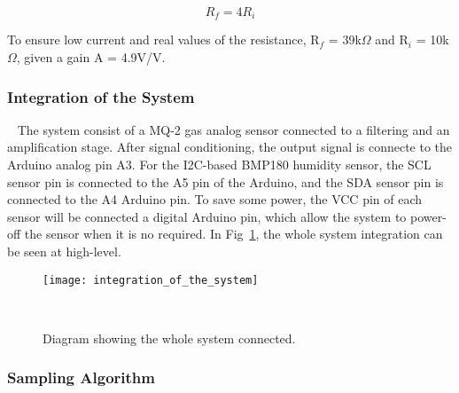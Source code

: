 \begin{equation}
    R_{f} = 4 R_{i}
\end{equation}

To ensure low current and real values of the resistance, R$_{f}$ = 39k$\Omega$ and R$_{i}$ = 10k$\Omega$, given a gain A = 4.9V/V.



\subsubsection{Integration of the System}
~\label{sec:methodology:dev_methodology:iots}
\hspace{8pt}
The system consist of a MQ-2 gas analog sensor connected to a filtering and an amplification stage. After signal conditioning, the output signal is connecte to the Arduino analog pin A3. For the I2C-based BMP180 humidity sensor, the SCL sensor pin is connected to the A5 pin of the Arduino, and the SDA sensor pin is connected to the A4 Arduino pin. To save some power, the VCC pin of each sensor will be connected a digital Arduino pin, which allow the system to power-off the sensor when it is no required. In Fig~\ref{fig:integration_of_the_system}, the whole system integration can be seen at high-level.


\begin{figure}[H]
    \centering
    \texttt{[image: integration\_of\_the\_system]}
    \caption{Diagram showing the whole system connected.}
~\label{fig:integration_of_the_system}
\end{figure}


\subsubsection{Sampling Algorithm}
~\label{sec:methodology:dev_methodology:sa}
\hspace{8pt}



